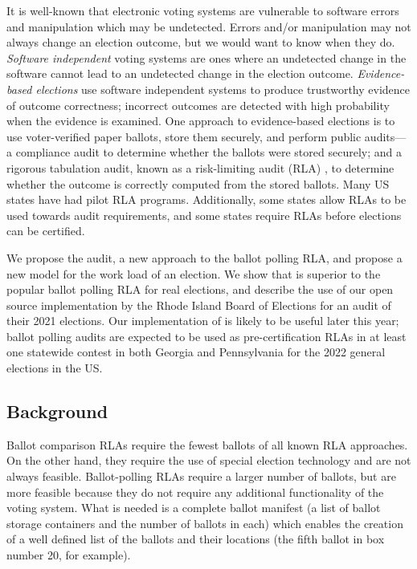 It is well-known that electronic voting systems are vulnerable to software errors and manipulation which may be undetected. Errors and/or manipulation may not always change an election outcome, but we would want to know when they do. {\em Software independent} voting systems \cite{SI-Wack,rivest2008notion} are ones where an undetected change in the software cannot lead to an undetected change in the election outcome. {\em Evidence-based elections} \cite{evidence-based} use software independent systems to produce trustworthy evidence of outcome correctness; incorrect outcomes are detected with high probability when the evidence is examined. One approach to evidence-based elections is to use voter-verified paper ballots, store them securely, and perform public audits---a compliance audit to determine whether the ballots were stored securely; and a rigorous tabulation audit, known as a risk-limiting audit (RLA) \cite{RLA}, to determine whether the outcome is correctly computed from the stored ballots. Many US states have had pilot RLA programs. Additionally, some states allow RLAs to be used towards audit requirements, and some states require RLAs before elections can be certified. 

We propose the \Providence audit, a new approach to the ballot polling RLA, and propose a new model for the work load of an election. We show that \Providence is superior to the popular ballot polling RLA \Bravo for real elections, and describe the use of our open source implementation by the Rhode Island Board of Elections for an audit of their 2021 elections. Our implementation of \Providence is likely to be useful later this year; ballot polling audits are expected to be used as pre-certification RLAs in at least one statewide contest in both Georgia and Pennsylvania for the 2022 general elections in the US.   

\subsection{Background}
Ballot comparison RLAs require the fewest ballots of all known RLA approaches. On the other hand, they require the use of special election technology and are not always feasible. Ballot-polling RLAs require a larger number of ballots, but are more feasible because they do not require any additional functionality of the voting system. What is needed is a complete ballot manifest (a list of ballot storage containers and the number of ballots in each) which enables the creation of a well defined list of the ballots and their locations (the fifth ballot in box number 20, for example). 

